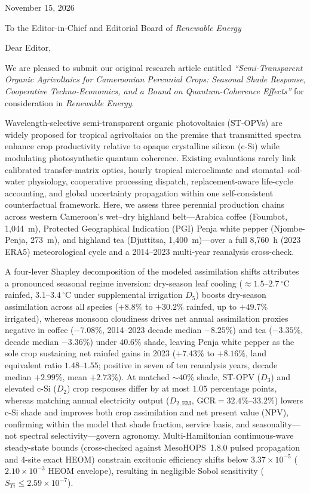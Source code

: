 \documentclass[10pt,a4paper]{article}
\begin{document}
\noindent
November 15, 2026

\vspace{0.6em}
\noindent
To the Editor-in-Chief and Editorial Board of \textit{Renewable Energy}

\vspace{0.6em}
\noindent
Dear Editor,

\vspace{0.5em}
\noindent
We are pleased to submit our original research article entitled \textit{``Semi-Transparent Organic Agrivoltaics for Cameroonian Perennial Crops: Seasonal Shade Response, Cooperative Techno-Economics, and a Bound on Quantum-Coherence Effects''} for consideration in \textit{Renewable Energy}.

Wavelength-selective semi-transparent organic photovoltaics (ST-OPVs) are widely proposed for tropical agrivoltaics on the premise that transmitted spectra enhance crop productivity relative to opaque crystalline silicon (c-Si) while modulating photosynthetic quantum coherence. Existing evaluations rarely link calibrated transfer-matrix optics, hourly tropical microclimate and stomatal--soil-water physiology, cooperative processing dispatch, replacement-aware life-cycle accounting, and global uncertainty propagation within one self-consistent counterfactual framework. Here, we assess three perennial production chains across western Cameroon's wet--dry highland belt---Arabica coffee (Foumbot, 1,044~m), Protected Geographical Indication (PGI) Penja white pepper (Njombe-Penja, 273~m), and highland tea (Djuttitsa, 1,400~m)---over a full 8,760~h (2023 ERA5) meteorological cycle and a 2014--2023 multi-year reanalysis cross-check.

A four-lever Shapley decomposition of the modeled assimilation shifts attributes a pronounced seasonal regime inversion: dry-season leaf cooling ($\approx 1.5$--$2.7\,^\circ\mathrm{C}$ rainfed, $3.1$--$3.4\,^\circ\mathrm{C}$ under supplemental irrigation $D_5$) boosts dry-season assimilation across all species ($+8.8\%$ to $+30.2\%$ rainfed, up to $+49.7\%$ irrigated), whereas monsoon cloudiness drives net annual assimilation proxies negative in coffee ($-7.08\%$, 2014--2023 decade median $-8.25\%$) and tea ($-3.35\%$, decade median $-3.36\%$) under $40.6\%$ shade, leaving Penja white pepper as the sole crop sustaining net rainfed gains in 2023 ($+7.43\%$ to $+8.16\%$, land equivalent ratio $1.48$--$1.55$; positive in seven of ten reanalysis years, decade median $+2.99\%$, mean $+2.73\%$). At matched $\sim 40\%$ shade, ST-OPV ($D_3$) and elevated c-Si ($D_2$) crop responses differ by at most $1.05$ percentage points, whereas matching annual electricity output ($D_{2,\mathrm{EM}}$, $\mathrm{GCR}=32.4\%$--$33.2\%$) lowers c-Si shade and improves both crop assimilation and net present value (NPV), confirming within the model that shade fraction, service basis, and seasonality---not spectral selectivity---govern agronomy. Multi-Hamiltonian continuous-wave steady-state bounds (cross-checked against MesoHOPS~1.8.0 pulsed propagation and 4-site exact HEOM) constrain excitonic efficiency shifts below $3.37\times 10^{-5}$ ($2.10\times 10^{-3}$ HEOM envelope), resulting in negligible Sobol sensitivity ($S_{Ti} \le 2.59\times 10^{-7}$).
\end{document}
